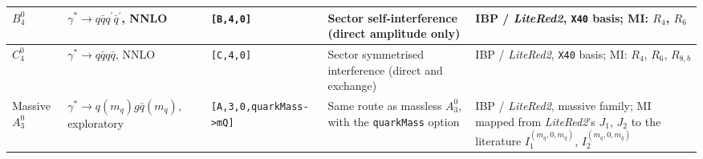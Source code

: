 \begin{center}
\begin{longtable}{|p{1.9cm}|>{\raggedright\arraybackslash}p{2.3cm}|p{2.1cm}|p{3.0cm}|p{3.4cm}|}
$B_4^0$ & $\gamma^*\to q\bar q q^\prime\bar q^\prime$, NNLO & \texttt{[B,4,0]} & Sector self-interference (direct amplitude only) & IBP / \textit{LiteRed2}, \texttt{X40} basis; MI: $R_4$, $R_6$ \\ \hline
$C_4^0$ & $\gamma^*\to q\bar q q\bar q$, NNLO & \texttt{[C,4,0]} & Sector symmetrised interference (direct and exchange) & IBP / \textit{LiteRed2}, \texttt{X40} basis; MI: $R_4$, $R_6$, $R_{8,b}$ \\ \hline
Massive $A_3^0$ & $\gamma^*\to q(m_q)g\bar q(m_q)$, exploratory & \texttt{[A,3,0,\newline quarkMass->\newline mQ]} & Same route as massless $A_3^0$, with the \texttt{quarkMass} option & IBP / \textit{LiteRed2}, massive family; MI mapped from \textit{LiteRed2}'s $J_1$, $J_2$ to the literature $I_1^{(m_q,0,m_q)}$, $I_2^{(m_q,0,m_q)}$ \\ \hline
\end{longtable}
\end{center}

